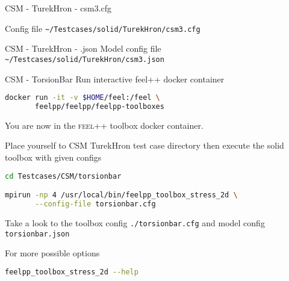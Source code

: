 \begin{frame}{CSM - TurekHron - csm3.cfg}

Config file \lstinline{~/Testcases/solid/TurekHron/csm3.cfg}

\vspace{5mm}


\end{frame}





\begin{frame}{CSM - TurekHron - .json}
Model config file \lstinline{~/Testcases/solid/TurekHron/csm3.json}
\vspace{5mm}


\end{frame}





\begin{frame}{CSM - TorsionBar}
Run  interactive feel++ docker container

\begin{lstlisting}[language=Bash,mathescape=false,emph={docker}]
docker run -it -v $HOME/feel:/feel \
       feelpp/feelpp/feelpp-toolboxes
\end{lstlisting}

You are now in the \textsc{feel++} toolbox docker container.

Place yourself to CSM TurekHron test case directory then execute the
solid toolbox with given configs

\begin{lstlisting}[language=Bash,mathescape=false, emph={feelpp_toolbox_solid_2d}]
cd Testcases/CSM/torsionbar

mpirun -np 4 /usr/local/bin/feelpp_toolbox_stress_2d \
       --config-file torsionbar.cfg
\end{lstlisting}

Take a look to the toolbox config \lstinline{./torsionbar.cfg} and model config
\lstinline{torsionbar.json}

For more possible options
\begin{lstlisting}[language=Bash,mathescape=false, emph={feelpp_toolbox_stress_2d}]
feelpp_toolbox_stress_2d --help
\end{lstlisting}

\end{frame}

